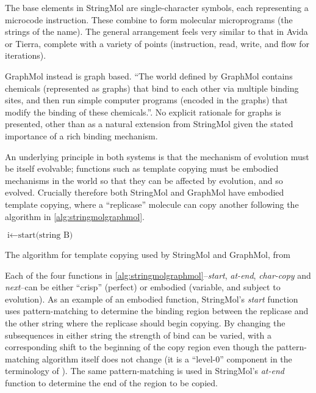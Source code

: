 The base elements in StringMol are single-character symbols, each representing a microcode instruction. These combine to form molecular microprograms (the strings of the name). The general arrangement feels very similar to that in Avida or Tierra, complete with a variety of points (instruction, read, write, and flow for iterations).

GraphMol instead is graph based. ``The world defined by GraphMol contains chemicals (represented as graphs) that bind to each other via multiple binding sites, and then run simple computer programs (encoded in the graphs) that modify the binding of these chemicals.''. No explicit rationale for graphs is presented, other than as a natural extension from StringMol given the stated importance of a rich binding mechanism. 

An underlying principle in both systems is that the mechanism of evolution must be itself evolvable; functions such as template copying must be embodied mechanisms in the world so that they can be affected by evolution, and so evolved.  Crucially therefore both StringMol and GraphMol have embodied template copying, where a ``replicase'' molecule can copy another following the algorithm in \cref{alg:stringmolgraphmol}.

\begin{algorithm}[ht]
	$\text{i} \leftarrow \text{start(string B)}$\;
	\caption[The algorithm for template copying used by StringMol and GraphMol]{The algorithm for template copying used by StringMol and GraphMol, from \textcite{Nellis2014}}
	\label{alg:stringmolgraphmol}
\end{algorithm}

Each of the four functions in \cref{alg:stringmolgraphmol}--\emph{start}, \emph{at-end}, \emph{char-copy} and \emph{next}--can be either ``crisp'' (\ie perfect) or embodied (variable, and subject to evolution). As an example of an embodied function, StringMol's \emph{start} function uses pattern-matching to determine the binding region between the replicase and the other string where the replicase should begin copying. By changing the subsequences in either string the strength of bind can be varied, with a corresponding shift to the beginning of the copy region even though the pattern-matching algorithm itself does not change (it is a ``level-0'' component in the terminology of \textcite{BanzhafBaumgaertnerBeslonEtAl2016}). The same pattern-matching is used in StringMol's \emph{at-end} function to determine the end of the region to be copied.

